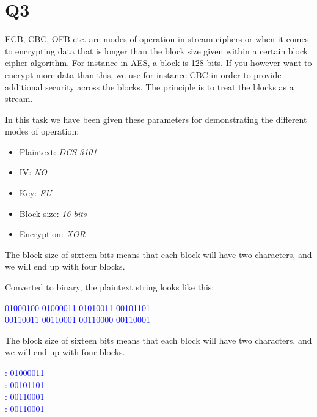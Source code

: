\documentclass{article}
\begin{document}
	




\newpage
\section{Q3}

ECB, CBC, OFB etc. are modes of operation in stream ciphers or when it comes to encrypting data that is longer than the block size given within a certain block cipher algorithm. For instance in AES, a block is 128 bits. If you however want to encrypt more data than this, we use for instance CBC in order to provide additional security across the blocks. The principle is to treat the blocks as a stream.

In this task we have been given these parameters for demonstrating the different modes of operation:
\begin{itemize}
\item{Plaintext: \textit{DCS-3101}}
\item{IV: \textit{NO}}
\item{Key: \textit{EU}}
\item{Block size: \textit{16 bits}}
\item{Encryption: \textit{XOR}}
\end{itemize}

The block size of sixteen bits means that each block will have two characters, and we will end up with four blocks.

Converted to binary, the plaintext string looks like this: 
\begin{tcolorbox}
\begin{center}
\textcolor{blue}{01000100 01000011 01010011 00101101 \\00110011 00110001 00110000 00110001}
\end{center}
\end{tcolorbox}

The block size of sixteen bits means that each block will have two characters, and we will end up with four blocks.

\begin{tcolorbox}
\begin{center}
\textcolor{blue}{
: 01000011\\
: 00101101\\
: 00110001\\
: 00110001}
\end{center}
\end{tcolorbox}
\end{document}
